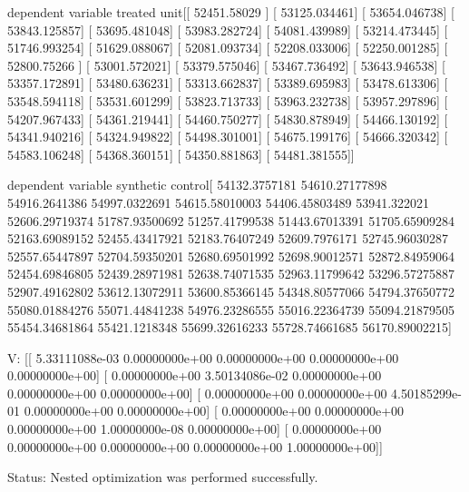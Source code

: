 dependent variable treated unit[[ 52451.58029 ]
 [ 53125.034461]
 [ 53654.046738]
 [ 53843.125857]
 [ 53695.481048]
 [ 53983.282724]
 [ 54081.439989]
 [ 53214.473445]
 [ 51746.993254]
 [ 51629.088067]
 [ 52081.093734]
 [ 52208.033006]
 [ 52250.001285]
 [ 52800.75266 ]
 [ 53001.572021]
 [ 53379.575046]
 [ 53467.736492]
 [ 53643.946538]
 [ 53357.172891]
 [ 53480.636231]
 [ 53313.662837]
 [ 53389.695983]
 [ 53478.613306]
 [ 53548.594118]
 [ 53531.601299]
 [ 53823.713733]
 [ 53963.232738]
 [ 53957.297896]
 [ 54207.967433]
 [ 54361.219441]
 [ 54460.750277]
 [ 54830.878949]
 [ 54466.130192]
 [ 54341.940216]
 [ 54324.949822]
 [ 54498.301001]
 [ 54675.199176]
 [ 54666.320342]
 [ 54583.106248]
 [ 54368.360151]
 [ 54350.881863]
 [ 54481.381555]]

dependent variable synthetic control[ 54132.3757181   54610.27177898  54916.2641386   54997.0322691
  54615.58010003  54406.45803489  53941.322021    52606.29719374
  51787.93500692  51257.41799538  51443.67013391  51705.65909284
  52163.69089152  52455.43417921  52183.76407249  52609.7976171
  52745.96030287  52557.65447897  52704.59350201  52680.69501992
  52698.90012571  52872.84959064  52454.69846805  52439.28971981
  52638.74071535  52963.11799642  53296.57275887  52907.49162802
  53612.13072911  53600.85366145  54348.80577066  54794.37650772
  55080.01884276  55071.44841238  54976.23286555  55016.22364739
  55094.21879505  55454.34681864  55421.1218348   55699.32616233
  55728.74661685  56170.89002215]

 V:
[[  5.33111088e-03   0.00000000e+00   0.00000000e+00   0.00000000e+00
    0.00000000e+00]
 [  0.00000000e+00   3.50134086e-02   0.00000000e+00   0.00000000e+00
    0.00000000e+00]
 [  0.00000000e+00   0.00000000e+00   4.50185299e-01   0.00000000e+00
    0.00000000e+00]
 [  0.00000000e+00   0.00000000e+00   0.00000000e+00   1.00000000e-08
    0.00000000e+00]
 [  0.00000000e+00   0.00000000e+00   0.00000000e+00   0.00000000e+00
    1.00000000e+00]]

 Status:
Nested optimization was performed successfully.